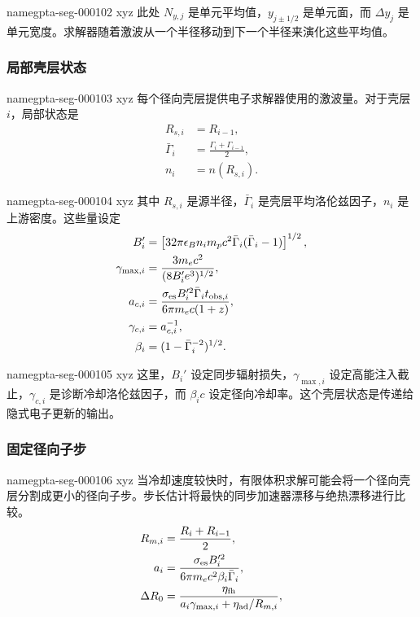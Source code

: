 \documentclass[twocolumn]{aastex702}
\makeatletter
\providecommand{\gptareaderanchor}[1]{\pdfdest name{#1} xyz}%
\providecommand{\gptareaderanchor}[1]{\special{pdf:dest (#1) [ @thispage /XYZ @xpos @ypos null ]}}%
\makeatother
\begin{document}
\gptareaderanchor{gpta-seg-000102}%
此处 \(N_{y,j}\) 是单元平均值，\(y_{j\pm1/2}\) 是单元面，而 \(\Delta y_j\) 是单元宽度。求解器随着激波从一个半径移动到下一个半径来演化这些平均值。

\subsubsection{局部壳层状态}


\gptareaderanchor{gpta-seg-000103}%
每个径向壳层提供电子求解器使用的激波量。对于壳层 \(i\)，局部状态是
\begin{equation}
\begin{aligned}
R_{s,i}&=R_{i-1},\\
\bar\Gamma_i&=\frac{\Gamma_i+\Gamma_{i-1}}{2},\\
n_i&=n(R_{s,i}).
\end{aligned}
\end{equation}

\gptareaderanchor{gpta-seg-000104}%
其中 \(R_{s,i}\) 是源半径，\(\bar\Gamma_i\) 是壳层平均洛伦兹因子，\(n_i\) 是上游密度。这些量设定
\begin{equation}
\begin{aligned}
B_i'&=\left[32\pi\epsilon_B n_i m_pc^2
\bar\Gamma_i(\bar\Gamma_i-1)\right]^{1/2},\\
\gamma_{\max,i}&=\frac{3m_ec^2}{(8B_i'e^3)^{1/2}},\\
a_{c,i}&=\frac{\sigma_{\rm es}B_i'^2\bar\Gamma_i t_{{\rm obs},i}}
{6\pi m_ec(1+z)},\\
\gamma_{c,i}&=a_{c,i}^{-1},\\
\beta_i&=(1-\bar\Gamma_i^{-2})^{1/2}.
\end{aligned}
\end{equation}

\gptareaderanchor{gpta-seg-000105}%
这里，\(B_i'\) 设定同步辐射损失，\(\gamma_{\max,i}\) 设定高能注入截止，\(\gamma_{c,i}\) 是诊断冷却洛伦兹因子，而 \(\beta_i c\) 设定径向冷却率。这个壳层状态是传递给隐式电子更新的输出。

\subsubsection{固定径向子步}


\gptareaderanchor{gpta-seg-000106}%
当冷却速度较快时，有限体积求解可能会将一个径向壳层分割成更小的径向子步。步长估计将最快的同步加速器漂移与绝热漂移进行比较。
\begin{equation}
\begin{aligned}
R_{m,i}&=\frac{R_i+R_{i-1}}{2},\\
a_i&=\frac{\sigma_{\rm es}B_i'^2}
{6\pi m_ec^2\beta_i\bar\Gamma_i},\\
\Delta R_0&=\frac{\eta_{\rm fh}}
{a_i\gamma_{\max,i}+\eta_{\rm ad}/R_{m,i}},
\end{aligned}
\end{equation}
\end{document}
